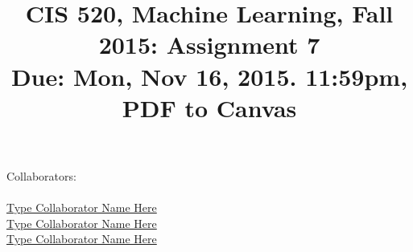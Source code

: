 \documentclass[english]{article}
\title{CIS 520, Machine Learning, Fall 2015: Assignment 7\\
Due: Mon,  Nov 16, 2015. 11:59pm, PDF to Canvas\\
\hpoints{100}}
\date{}
\begin{document}
\maketitle
{\normalsize Collaborators: \\ 
\\ \underline{ Type Collaborator Name Here        }
\\ \underline{ Type Collaborator Name Here        } 
\\ \underline{ Type Collaborator Name Here        }}

\end{document}
